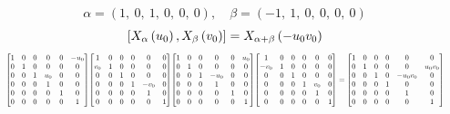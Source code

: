 \documentclass[11pt]{article}
\theoremstyle{definition}
\begin{document}
\[
\alpha = \left( 1, \  0, \  1, \  0, \  0, \  0\right), \quad \beta = \left( -1, \  1, \  0, \  0, \  0, \  0\right)
\]
\[
\scaletoalign{\textwidth}{\left[ X_{\alpha}\left(u_{0}\right), X_{\beta}\left(v_{0}\right) \right] = X_{\alpha + \beta}\left(- u_{0} v_{0}\right)}
\]
\[
\scaletoalign{\textwidth}{{\left[\begin{matrix}1 & 0 & 0 & 0 & 0 & - u_{0}\\0 & 1 & 0 & 0 & 0 & 0\\0 & 0 & 1 & u_{0} & 0 & 0\\0 & 0 & 0 & 1 & 0 & 0\\0 & 0 & 0 & 0 & 1 & 0\\0 & 0 & 0 & 0 & 0 & 1\end{matrix}\right]} {\left[\begin{matrix}1 & 0 & 0 & 0 & 0 & 0\\v_{0} & 1 & 0 & 0 & 0 & 0\\0 & 0 & 1 & 0 & 0 & 0\\0 & 0 & 0 & 1 & - v_{0} & 0\\0 & 0 & 0 & 0 & 1 & 0\\0 & 0 & 0 & 0 & 0 & 1\end{matrix}\right]} {\left[\begin{matrix}1 & 0 & 0 & 0 & 0 & u_{0}\\0 & 1 & 0 & 0 & 0 & 0\\0 & 0 & 1 & - u_{0} & 0 & 0\\0 & 0 & 0 & 1 & 0 & 0\\0 & 0 & 0 & 0 & 1 & 0\\0 & 0 & 0 & 0 & 0 & 1\end{matrix}\right]} {\left[\begin{matrix}1 & 0 & 0 & 0 & 0 & 0\\- v_{0} & 1 & 0 & 0 & 0 & 0\\0 & 0 & 1 & 0 & 0 & 0\\0 & 0 & 0 & 1 & v_{0} & 0\\0 & 0 & 0 & 0 & 1 & 0\\0 & 0 & 0 & 0 & 0 & 1\end{matrix}\right]} = {\left[\begin{matrix}1 & 0 & 0 & 0 & 0 & 0\\0 & 1 & 0 & 0 & 0 & u_{0} v_{0}\\0 & 0 & 1 & 0 & - u_{0} v_{0} & 0\\0 & 0 & 0 & 1 & 0 & 0\\0 & 0 & 0 & 0 & 1 & 0\\0 & 0 & 0 & 0 & 0 & 1\end{matrix}\right]}}
\]
\end{document}

